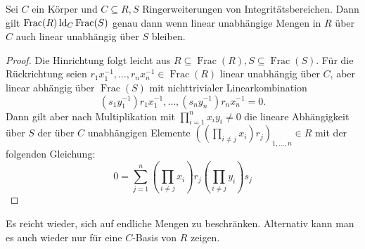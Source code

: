     \begin{lemma}\label{Fraktionskörper}
    	Sei $C$ ein Körper und $C\subseteq R,S$ Ringerweiterungen von Integritätsbereichen. Dann gilt $\operatorname{Frac}(R)\operatorname{ld}_C\operatorname{Frac}(S)$ genau dann wenn linear unabhängige Mengen in $R$ über $C$ auch linear unabhängig über $S$ bleiben.
    \end{lemma}
    \begin{proof}
    	Die Hinrichtung folgt leicht aus $R\subseteq\operatorname{Frac}(R),S\subseteq\operatorname{Frac}(S)$. Für die Rückrichtung seien $r_1x_1^{-1},\dots,r_nx_n^{-1}\in\operatorname{Frac}(R)$ linear unabhängig über $C$, aber linear abhängig über $\operatorname{Frac}(S)$ mit nichttrivialer Linearkombination $$(s_1y_1^{-1})r_1x_1^{-1},\dots,(s_ny_n^{-1})r_nx_n^{-1}=0.$$ Dann gilt aber nach Multiplikation mit $\prod\limits_{i=1}^nx_iy_i\neq0$ die lineare Abhängigkeit über $S$ der über $C$ unabhängigen Elemente $((\prod\limits_{i\neq j}x_i)r_j)_{1,\dots,n}\in R$ mit der folgenden Gleichung: $$0=\sum\limits_{j=1}^n(\prod\limits_{i\neq j}x_i)r_j(\prod\limits_{i\neq j}y_i)s_j$$
    \end{proof}
    
    \begin{remark}
    	Es reicht wieder, sich auf endliche Mengen zu beschränken. Alternativ kann man es auch wieder nur für eine $C$-Basis von $R$ zeigen.
    \end{remark}
    
